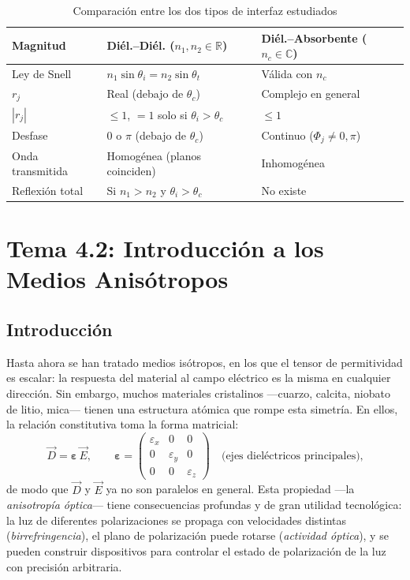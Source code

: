 \documentclass[12pt, a4paper]{article}
\theoremstyle{plain}
\theoremstyle{definition}
\theoremstyle{remark}
\newcommand{\R}{\mathbb{R}}
\newcommand{\C}{\mathbb{C}}
\newcommand{\ve}[1]{\vec{#1}}
\begin{document}
\begin{table}[H]
  \centering
  \caption{Comparación entre los dos tipos de interfaz estudiados}
  \label{tab:comparacion_interfaces}
  \begin{tabularx}{0.98\linewidth}{@{}L{2.9cm}Y Y@{}}
    \toprule
    \textbf{Magnitud} & \textbf{Diél.--Diél. ($n_1, n_2 \in \R$)}
                      & \textbf{Diél.--Absorbente ($n_c \in \C$)} \\
    \midrule
    Ley de Snell & $n_1\sin\theta_i = n_2\sin\theta_t$ & Válida con $n_c$ \\
    $r_j$ & Real (debajo de $\theta_c$) & Complejo en general \\
    $|r_j|$ & $\leq 1$, $= 1$ solo si $\theta_i > \theta_c$ & $\leq 1$ \\
    Desfase & 0 o $\pi$ (debajo de $\theta_c$) & Continuo ($\Phi_j \neq 0, \pi$) \\
    Onda transmitida & Homogénea (planos coinciden) & Inhomogénea \\
    Reflexión total & Si $n_1 > n_2$ y $\theta_i > \theta_c$ & No existe \\
    \bottomrule
  \end{tabularx}
\end{table}

\section{Tema 4.2: Introducción a los Medios Anisótropos}

\subsection{Introducción}

Hasta ahora se han tratado medios isótropos, en los que el tensor de
permitividad es escalar: la respuesta del material al campo eléctrico es la
misma en cualquier dirección. Sin embargo, muchos materiales cristalinos
—cuarzo, calcita, niobato de litio, mica— tienen una estructura atómica
que rompe esta simetría. En ellos, la relación constitutiva toma la forma
matricial:
\begin{equation}
  \ve{D} = \boldsymbol{\varepsilon}\,\ve{E},
  \qquad
  \boldsymbol{\varepsilon} =
  \begin{pmatrix}
    \varepsilon_x & 0 & 0 \\
    0 & \varepsilon_y & 0 \\
    0 & 0 & \varepsilon_z
  \end{pmatrix}
  \quad\text{(ejes dieléctricos principales),}
\end{equation}
de modo que $\ve{D}$ y $\ve{E}$ ya no son paralelos en general. Esta
propiedad —la \emph{anisotropía óptica}— tiene consecuencias profundas y
de gran utilidad tecnológica: la luz de diferentes polarizaciones se propaga
con velocidades distintas (\emph{birrefringencia}), el plano de polarización
puede rotarse (\emph{actividad óptica}), y se pueden construir dispositivos
para controlar el estado de polarización de la luz con precisión arbitraria.
\end{document}
